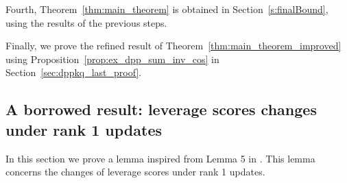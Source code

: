 \documentclass[twoside,11pt]{book}
\numberwithin{theorem}{chapter}
\numberwithin{definition}{chapter}
\numberwithin{proposition}{chapter}
\numberwithin{corollary}{chapter}
\numberwithin{example}{chapter}
\numberwithin{lemma}{chapter}
\numberwithin{assumption}{chapter}
\numberwithin{equation}{chapter}
\numberwithin{figure}{chapter}
\begin{document}


Fourth, Theorem~\ref{thm:main_theorem} is obtained in Section~\ref{s:finalBound}, using the results of the previous steps.

Finally, we prove the refined result of Theorem~\ref{thm:main_theorem_improved} using Proposition~\ref{prop:ex_dpp_sum_inv_cos} in Section~\ref{sec:dppkq_last_proof}.  


\subsection{A borrowed result: leverage scores changes under rank 1 updates} \label{subsec:lv_score_updates}


In this section we prove a lemma inspired from Lemma 5 in \cite{Coh15}. This lemma concerns the changes of leverage scores under rank 1 updates.

\end{document}
